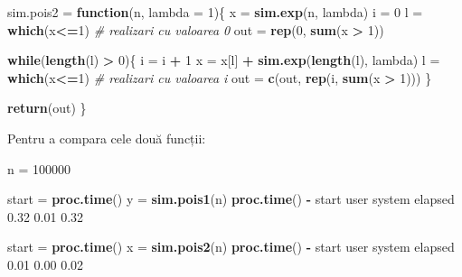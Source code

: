 \documentclass[]{article}
\newenvironment{Shaded}{\begin{snugshade}}{\end{snugshade}}
\newcommand{\KeywordTok}[1]{\textcolor[rgb]{0.13,0.29,0.53}{\textbf{#1}}}
\newcommand{\DataTypeTok}[1]{\textcolor[rgb]{0.13,0.29,0.53}{#1}}
\newcommand{\DecValTok}[1]{\textcolor[rgb]{0.00,0.00,0.81}{#1}}
\newcommand{\FloatTok}[1]{\textcolor[rgb]{0.00,0.00,0.81}{#1}}
\newcommand{\StringTok}[1]{\textcolor[rgb]{0.31,0.60,0.02}{#1}}
\newcommand{\CommentTok}[1]{\textcolor[rgb]{0.56,0.35,0.01}{\textit{#1}}}
\newcommand{\ControlFlowTok}[1]{\textcolor[rgb]{0.13,0.29,0.53}{\textbf{#1}}}
\newcommand{\OperatorTok}[1]{\textcolor[rgb]{0.81,0.36,0.00}{\textbf{#1}}}
\newcommand{\NormalTok}[1]{#1}
\begin{document}
\begin{Shaded}
\begin{Highlighting}[]
\NormalTok{sim.pois2 =}\StringTok{ }\ControlFlowTok{function}\NormalTok{(n, }\DataTypeTok{lambda =} \DecValTok{1}\NormalTok{)\{}
\NormalTok{  x =}\StringTok{ }\KeywordTok{sim.exp}\NormalTok{(n, lambda)}
\NormalTok{  i =}\StringTok{ }\DecValTok{0}
\NormalTok{  l =}\StringTok{ }\KeywordTok{which}\NormalTok{(x}\OperatorTok{<=}\DecValTok{1}\NormalTok{)}
  \CommentTok{# realizari cu valoarea 0}
\NormalTok{  out =}\StringTok{ }\KeywordTok{rep}\NormalTok{(}\DecValTok{0}\NormalTok{, }\KeywordTok{sum}\NormalTok{(x }\OperatorTok{>}\StringTok{ }\DecValTok{1}\NormalTok{)) }
  
  \ControlFlowTok{while}\NormalTok{(}\KeywordTok{length}\NormalTok{(l) }\OperatorTok{>}\StringTok{ }\DecValTok{0}\NormalTok{)\{}
\NormalTok{    i =}\StringTok{ }\NormalTok{i }\OperatorTok{+}\StringTok{ }\DecValTok{1}
\NormalTok{    x =}\StringTok{ }\NormalTok{x[l] }\OperatorTok{+}\StringTok{ }\KeywordTok{sim.exp}\NormalTok{(}\KeywordTok{length}\NormalTok{(l), lambda)}
\NormalTok{    l =}\StringTok{ }\KeywordTok{which}\NormalTok{(x}\OperatorTok{<=}\DecValTok{1}\NormalTok{)}
    \CommentTok{# realizari cu valoarea i}
\NormalTok{    out =}\StringTok{ }\KeywordTok{c}\NormalTok{(out, }\KeywordTok{rep}\NormalTok{(i, }\KeywordTok{sum}\NormalTok{(x }\OperatorTok{>}\StringTok{ }\DecValTok{1}\NormalTok{))) }
\NormalTok{  \}}
  
  \KeywordTok{return}\NormalTok{(out)}
\NormalTok{\}}
\end{Highlighting}
\end{Shaded}

Pentru a compara cele două funcții:

\begin{Shaded}
\begin{Highlighting}[]
\NormalTok{n =}\StringTok{ }\DecValTok{100000}

\NormalTok{start =}\StringTok{ }\KeywordTok{proc.time}\NormalTok{()}
\NormalTok{y =}\StringTok{ }\KeywordTok{sim.pois1}\NormalTok{(n)}
\KeywordTok{proc.time}\NormalTok{() }\OperatorTok{-}\StringTok{ }\NormalTok{start}
\NormalTok{   user  system elapsed }
   \FloatTok{0.32}    \FloatTok{0.01}    \FloatTok{0.32} 

\NormalTok{start =}\StringTok{ }\KeywordTok{proc.time}\NormalTok{()}
\NormalTok{x =}\StringTok{ }\KeywordTok{sim.pois2}\NormalTok{(n)}
\KeywordTok{proc.time}\NormalTok{() }\OperatorTok{-}\StringTok{ }\NormalTok{start}
\NormalTok{   user  system elapsed }
   \FloatTok{0.01}    \FloatTok{0.00}    \FloatTok{0.02} 
\end{Highlighting}
\end{Shaded}
\end{document}
